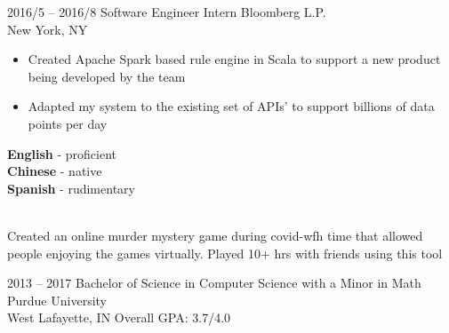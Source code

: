 \documentclass[9pt]{developercv} %
\begin{document}
\begin{entrylist}
{\begin{itemize}[leftmargin=-0.0125in]
				\end{itemize}
		}
	\entry
		{2016/5 -- 2016/8}
		{Software Engineer Intern}
		{Bloomberg L.P. \\\footnotesize{New York, NY}}
		{
			\begin{itemize}[leftmargin=-0.0125in]
		\item Created Apache Spark based rule engine in Scala to support a new product being developed by the team
		\item Adapted my system to the existing set of APIs'  to support billions of data points per day
	 	\end{itemize}
		}
\end{entrylist}


\begin{minipage}[t]{0.4\textwidth} %
	\vspace{-\baselineskip} %

	\begin{barchart}{4}
	\end{barchart}
\end{minipage}
\hfill
\begin{minipage}[t]{0.3\textwidth}
	\vspace{-\baselineskip} %
	
	
	\textbf{English} - proficient\\
	\textbf{Chinese} - native\\
	\textbf{Spanish} - rudimentary

	\\
    Created an online murder mystery game during covid-wfh time that allowed people enjoying the games virtually. Played 10+ hrs with friends using this tool
\end{minipage}
\hfill


\begin{entrylist}
	\entry
		{2013 -- 2017}
		{Bachelor of Science in Computer Science with a Minor in Math}
		{Purdue University \\\footnotesize{West Lafayette, IN}}
		{Overall GPA: 3.7/4.0}
\end{entrylist}



\end{document}
